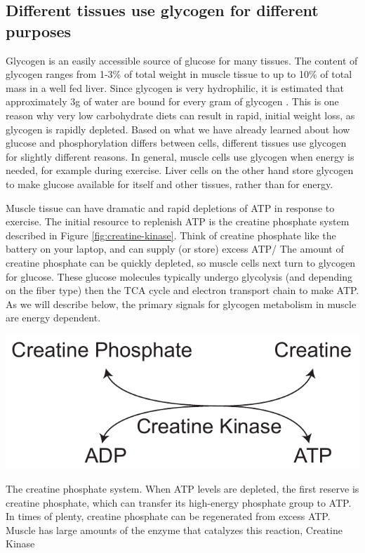 \documentclass{tufte-handout}
\begin{document}
\subsection{Different tissues use glycogen for different purposes}

Glycogen is an easily accessible source of glucose for many tissues.  The content of glycogen ranges from 1-3\% of total weight in muscle tissue to up to 10\% of total mass in a well fed liver.  Since glycogen is very hydrophilic, it is estimated that approximately 3g of water are bound for every gram of glycogen \citep{Olsson1970,Fernandez-Elias2015}.  This is one reason why very low carbohydrate diets can result in rapid, initial weight loss, as glycogen is rapidly depleted. Based on what we have already learned about how glucose and phosphorylation differs between cells, different tissues use glycogen for slightly different reasons.  In general, muscle cells use glycogen when energy is needed, for example during exercise.  Liver cells on the other hand store glycogen to make glucose available for itself and other tissues, rather than for energy.

   Muscle tissue can have dramatic and rapid depletions of ATP in response to exercise.  The initial resource to replenish ATP is the creatine phosphate system described in Figure \ref{fig:creatine-kinase}.  Think of creatine phosphate like the battery on your laptop, and can supply (or store) excess ATP/  The amount of creatine phosphate can be quickly depleted, so muscle cells next turn to glycogen for glucose.  These glucose molecules typically undergo glycolysis (and depending on the fiber type) then the TCA cycle and electron transport chain to make ATP. As we will describe below, the primary signals for glycogen metabolism in muscle are energy dependent.

\begin{marginfigure}
\includegraphics{figures/creatine-kinase.pdf}
\caption{The creatine phosphate system.  When ATP levels are depleted, the first reserve is creatine phosphate, which can transfer its high-energy phosphate group to ATP.  In times of plenty, creatine phosphate can be regenerated from excess ATP.  Muscle has large amounts of the enzyme that catalyzes this reaction, Creatine Kinase}
\label{fig:creatine-kinase}
\end{marginfigure}
\end{document}
